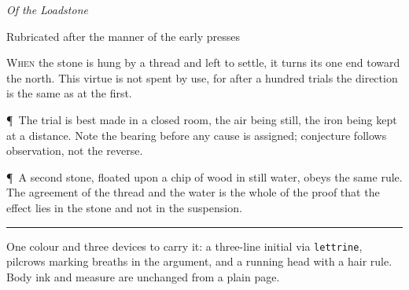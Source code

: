 \documentclass[11pt]{article}
\newcommand{\rubricp}{\textcolor{rubric}{\P}\ }
\newcommand{\rubricp}{}
\newcommand{\incipit}[2]{\lettrine[lines=3,loversize=0.08,findent=0.35em,nindent=0em]{\textcolor{rubric}{#1}}{#2}}
\newcommand{\incipit}[2]{\noindent #1#2}
\begin{document}
\begin{center}
  {\small{}}\par
  \vspace{0.3em}
  {\Large\textit{Of the Loadstone}}\par
  \vspace{0.3em}
  {\footnotesize\textcolor{rubric}{Rubricated after the manner of the early presses}}
\end{center}

\vspace{0.8em}

\incipit{W}{hen} the stone is hung by a thread and left to
settle, it turns its one end toward the north. This virtue is not spent by
use, for after a hundred trials the direction is the same as at the first.

\rubricp The trial is best made in a closed room, the air being still, the
iron being kept at a distance. Note the bearing before any cause is
assigned; conjecture follows observation, not the reverse.

\rubricp A second stone, floated upon a chip of wood in still water, obeys
the same rule. The agreement of the thread and the water is the whole of
the proof that the effect lies in the stone and not in the suspension.

\vspace{1em}
\begin{center}
  \textcolor{rubric}{\rule{0.3\linewidth}{0.45pt}}
\end{center}

\footnotesize\noindent
One colour and three devices to carry it: a three-line initial via
\texttt{lettrine}, pilcrows marking breaths in the argument, and a running
head with a hair rule. Body ink and measure are unchanged from a plain page.

\medskip\noindent\itshape\atlasstamp
\end{document}
